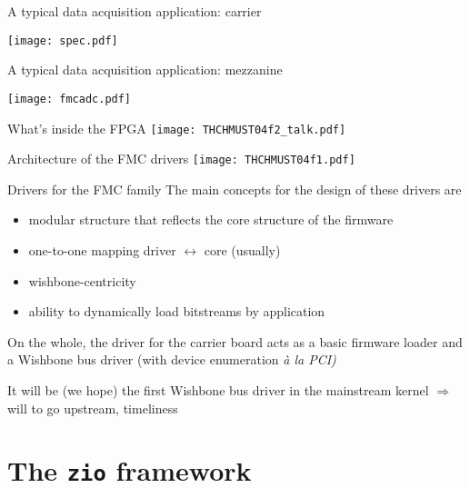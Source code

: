 \documentclass[compress,red]{beamer}
\begin{document}
\begin{frame}{A typical data acquisition application: carrier}
\begin{center}
\texttt{[image: spec.pdf]}
\end{center}
\end{frame}

\begin{frame}{A typical data acquisition application: mezzanine}
\begin{center}
\texttt{[image: fmcadc.pdf]}
\end{center}
\end{frame}

\begin{frame}{What's inside the FPGA}
\texttt{[image: THCHMUST04f2\_talk.pdf]}
\end{frame}

\begin{frame}{Architecture of the FMC drivers}
\texttt{[image: THCHMUST04f1.pdf]}
\end{frame}

\begin{frame}{Drivers for the FMC family}
The main concepts for the design of these drivers are
\begin{itemize}
\pause
\item modular structure that reflects the core structure of the firmware
\pause
\item one-to-one mapping driver $\leftrightarrow$ core (usually)
\pause
\item wishbone-centricity
\pause
\item ability to dynamically load bitstreams by application
\end{itemize}
\pause
On the whole, the driver for the carrier board acts as a basic firmware
loader and a Wishbone bus driver (with device enumeration
\emph{\`a la PCI)}

\pause
It will be (we hope) the first Wishbone bus driver in the mainstream
kernel $\Rightarrow$ will to go upstream, timeliness
\end{frame}

\section{The \texttt{zio} framework}
\end{document}
